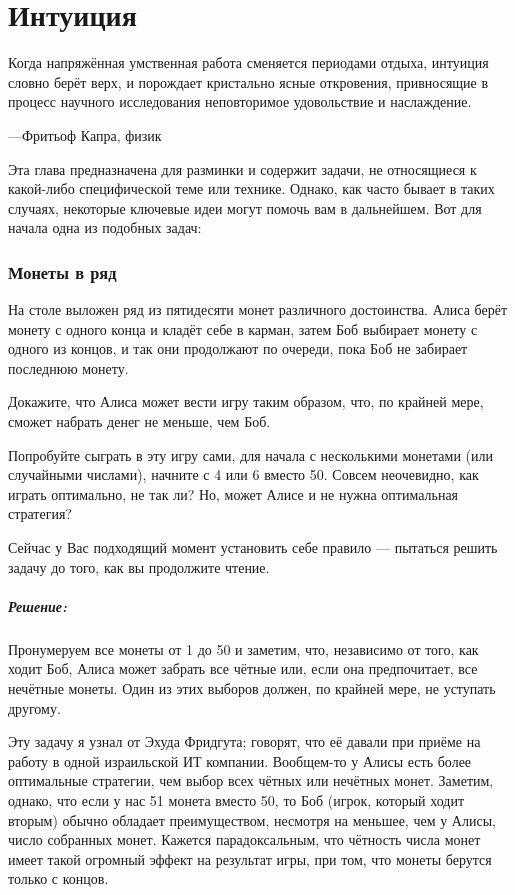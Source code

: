 \chapter*{Интуиция}

\setlength{\epigraphwidth}{.8\textwidth}
\epigraph{Когда напряжённая умственная работа сменяется периодами отдыха, интуиция словно берёт верх, и порождает кристально ясные откровения, привносящие в процесс научного исследования неповторимое удовольствие и наслаждение.}{---Фритьоф Капра, физик}

Эта глава предназначена для разминки и содержит задачи, не относящиеся к какой-либо специфической теме или технике.
Однако, как часто бывает в таких случаях, некоторые ключевые идеи могут помочь вам в дальнейшем.
 Вот для начала одна из подобных задач:

\subsection*{Монеты в ряд} %

На столе выложен ряд из пятидесяти монет различного достоинства.
Алиса берёт монету с одного конца и кладёт себе в карман, затем Боб выбирает монету с одного из концов, и так они продолжают по очереди, пока Боб не забирает последнюю монету.

Докажите, что Алиса может вести игру таким образом, что, по крайней мере, сможет набрать денег не меньше, чем Боб.

\medskip

Попробуйте сыграть в эту игру сами, для начала с несколькими монетами (или случайными числами), начните с 4 или 6 вместо 50.
Совсем неочевидно, как играть оптимально, не так ли?
Но, может Алисе и не нужна оптимальная стратегия? 

Сейчас у Вас подходящий момент установить себе правило --- пытаться решить задачу до того, как вы продолжите чтение.

\paragraph{Решение:}
Пронумеруем все монеты от 1 до 50 и заметим, что, независимо от того, как ходит Боб, Алиса может забрать все чётные или, если она предпочитает, все нечётные монеты.
Один из этих выборов должен, по крайней мере, не уступать другому.
\heart

Эту задачу я узнал от Эхуда Фридгута;
говорят, что её давали при приёме на работу в одной израильской ИТ компании.
Вообщем-то у Алисы есть более оптимальные стратегии, чем выбор всех чётных или нечётных монет.
Заметим, однако, что если у нас 51 монета вместо 50, то Боб (игрок, который ходит вторым) обычно обладает преимуществом, несмотря на меньшее, чем у Алисы, число собранных монет.
Кажется парадоксальным, что чётность числа монет имеет такой огромный эффект на результат игры, при том, что монеты берутся только с концов.

